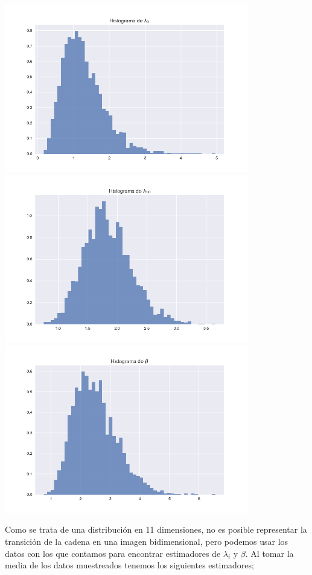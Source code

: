 \documentclass{article}
\begin{document}
\begin{enumerate}
\begin{center}
        \includegraphics[width=0.8\textwidth]{Tarea8/hist8.png}
        \includegraphics[width=0.8\textwidth]{Tarea8/hist9.png}
        \includegraphics[width=0.8\textwidth]{Tarea8/hist10.png}
    \end{center}

    Como se trata de una distribución en 11 dimensiones, no es posible representar la
    transición de la cadena en una imagen bidimensional, pero podemos usar los datos 
    con los que contamos para encontrar estimadores de $\lambda_i$ y $\beta$. Al tomar
    la media de los datos muestreados tenemos los siguientes estimadores;


\end{enumerate}
\end{document}

